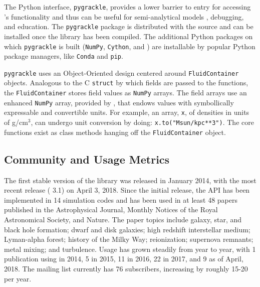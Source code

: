 The Python interface, \texttt{pygrackle}, provides a lower barrier to
entry for accessing \grackle{}'s functionality and thus can be
useful for semi-analytical models \citep[e.g.,][]{2016ApJ...820...71C,
2016MNRAS.459.4209A}, debugging, and education.  The
\texttt{pygrackle} package is distributed with the \grackle{} source
and can be installed once the library has been compiled.  The
additional Python packages on which \texttt{pygrackle} is built
(\texttt{NumPy}, \texttt{Cython}, and \yt{}) are
installable by popular Python package managers, like \texttt{Conda}
and \texttt{pip}.

\texttt{pygrackle} uses an Object-Oriented design centered around
\texttt{FluidContainer} objects.  Analogous to the C \texttt{struct}
by which fields are passed to the \grackle{} functions, the
\texttt{FluidContainer} stores field values as \texttt{NumPy}
arrays.  The field arrays use an enhanced \texttt{NumPy} array,
provided by \yt{}, that endows values with symbollically expressable
and convertible units.  For example, an array, \texttt{x}, of densities in units of
g/cm$^{3}$, can undergo unit conversion by doing:
\texttt{x.to("Msun/kpc**3")}.  The core \grackle{} functions exist as
class methods hanging off the \texttt{FluidContainer} object.

\subsection{Community and Usage Metrics}

The first stable version of the \grackle{} library was released in
January 2014, with the most recent release (\grackle{} 3.1) on April
3, 2018.  Since the initial release, the \grackle{} API has been
implemented in 14 simulation codes and has been used in at least 48 papers
published in the Astrophysical Journal, Monthly Notices of the Royal
Astronomical Society, and Nature.  The paper topics include galaxy,
star, and black hole formation; dwarf
and disk galaxies; high redshift interstellar medium; Lyman-alpha
forest; history of the Milky Way; reionization; supernova
remnants; metal mixing; and turbulence.  Usage has grown steadily
from year to year, with 1 publication using \grackle{} in 2014, 5 in
2015, 11 in 2016, 22 in 2017, and 9 as of April, 2018.  The
\grackle{} mailing list currently has 76 subscribers, increasing by
roughly 15-20 per year.

